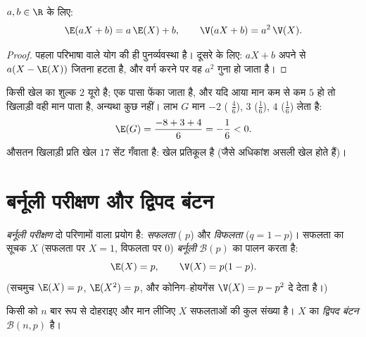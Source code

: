 \begin{proposition}\label{prop:g12:randvar:affine}
$a, b \in \R$ के लिए:
\[
\E(aX + b) = a\,\E(X) + b, \qquad
\V(aX + b) = a^2\,\V(X) .
\]
\end{proposition}

\begin{proof}
पहला परिभाषा वाले योग की ही पुनर्व्यवस्था है। दूसरे के लिए: $aX + b$ अपने 
से $a(X - \E(X))$ जितना हटता है, और वर्ग करने पर वह $a^2$ गुना हो जाता है।
\end{proof}

\begin{example}[न्यायसंगत खेल]\label{ex:g12:randvar:game}
किसी खेल का शुल्क $2$ यूरो है; एक पासा फेंका जाता है, और यदि आया मान कम से
कम $5$ हो तो खिलाड़ी वही मान पाता है, अन्यथा कुछ नहीं। लाभ $G$ मान $-2$
( $\frac46$), $3$ ($\frac16$), $4$ ($\frac16$) लेता है:
\[
\E(G) = \frac{-8 + 3 + 4}{6} = -\frac{1}{6} < 0 .
\]
औसतन खिलाड़ी प्रति खेल $17$ सेंट गँवाता है: खेल प्रतिकूल है (जैसे अधिकांश
असली खेल होते हैं)।
\end{example}

\section{बर्नूली परीक्षण और द्विपद बंटन}

\begin{definition}[बर्नूली बंटन]\label{def:g12:randvar:bernoulli}
\emph{बर्नूली परीक्षण} दो परिणामों वाला प्रयोग है:
\emph{सफलता} ( $p$) और \emph{विफलता} ($q = 1 - p$)। सफलता का सूचक $X$
(सफलता पर $X = 1$, विफलता पर $0$) \emph{बर्नूली } $\mathcal B(p)$ का पालन करता है:
\[
\E(X) = p, \qquad \V(X) = p(1-p) .
\]
(सचमुच $\E(X) = p$, $\E(X^2) = p$, और कोनिग--होयगेंस $\V(X) = p - p^2$ दे देता है।)
\end{definition}

\begin{definition}[द्विपद बंटन]\label{def:g12:randvar:binomial}
किसी  को $n$ बार  रूप से दोहराइए और मान लीजिए $X$
सफलताओं की कुल संख्या है। $X$ का  \emph{द्विपद बंटन}
$\mathcal B(n, p)$ है।
\end{definition}

